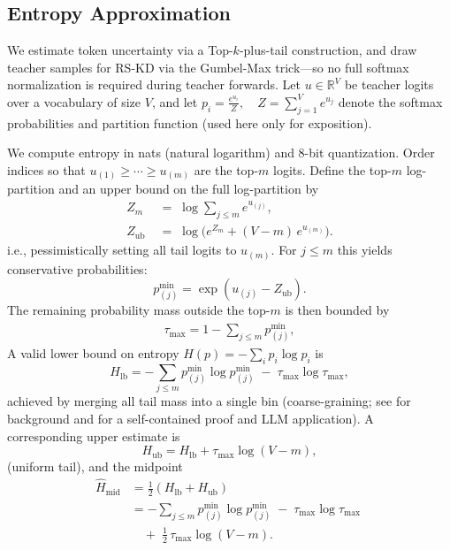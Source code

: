 \documentclass[11pt]{article}
\begin{document}
\subsection{Entropy Approximation}
\label{sec:entropy}
We estimate token uncertainty via a Top-$k$-plus-tail construction, and draw teacher samples for RS-KD via the Gumbel-Max trick---so no full softmax normalization is required during teacher forwards.
Let $u \in \mathbb{R}^V$ be teacher logits over a vocabulary of size $V$, and let
$
	p_i=\frac{e^{u_i}}{Z},\quad Z=\sum_{j=1}^V e^{u_j}
$
denote the softmax probabilities and partition function (used here only for exposition).

We compute entropy in nats (natural logarithm) and 8-bit quantization.
Order indices so that $u_{(1)} \geq \cdots \geq u_{(m)}$ are the top-$m$ logits.
Define the top-$m$ log-partition and an upper bound on the full log-partition by
\begin{align*}
	Z_m \;           & =\; \log \sum_{j \leq m} e^{u_{(j)}},           \\
	Z_{\text{ub}} \; & =\; \log\Big(e^{Z_m} + (V-m)\,e^{u_{(m)}}\Big).
\end{align*}
i.e., pessimistically setting all tail logits to $u_{(m)}$. For $j\le m$ this yields conservative probabilities:
\[
	p^{\min}_{(j)}=\exp(u_{(j)}-Z_{\text{ub}}).
\]
The remaining probability mass outside the top-$m$ is then bounded by
\begin{align*}
	\tau_{\max}=1-\sum_{j\le m}p^{\min}_{(j)},
\end{align*}
A valid lower bound on entropy $H(p)=-\sum_i p_i\log p_i$ is
\[
	H_{\text{lb}}=-\sum_{j\le m} p^{\min}_{(j)}\log p^{\min}_{(j)}\;-\;\tau_{\max}\log\tau_{\max},
\]
achieved by merging all tail mass into a single bin (coarse-graining; see \citep{cover2006elements} for background and \citep[\S3.6]{kaltchenko2025entropyheatmap} for a self-contained proof and LLM application). A corresponding upper estimate is
\[
	H_{\text{ub}}=H_{\text{lb}}+\tau_{\max}\log(V-m),
\]
(uniform tail), and the midpoint
\begin{align*}
	\widehat{H}_{\text{mid}} & =\tfrac12\!\left(H_{\text{lb}}+H_{\text{ub}}\right)                                   \\
	                         & = -\sum_{j\le m}p^{\min}_{(j)}\log p^{\min}_{(j)} \;-\; \tau_{\max}\log\tau_{\max} \; \\
	                         & \quad +\; \tfrac12\,\tau_{\max}\log(V-m).
\end{align*}
\end{document}
